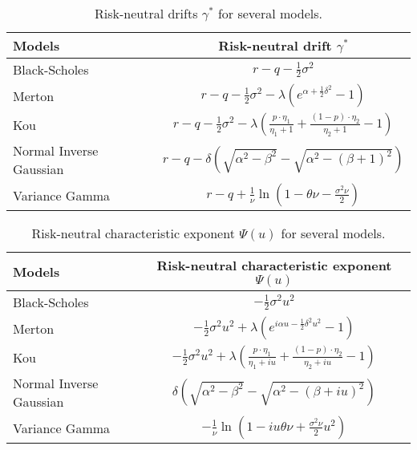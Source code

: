 \begin{table}[!ht]
\centering
  
  \begin{tabular}{l|c}
    \toprule
    Models & Risk-neutral drift $\gamma^\ast$ \\
    \toprule
   Black-Scholes & $r-q-\frac{1}{2}\sigma^2$ \\
   \midrule
   Merton & $r-q -\frac{1}{2}\sigma^2 - \lambda\left(e^{\alpha+\frac{1}{2}\delta^2}-1\right)$\\
   Kou & $r-q- \frac{1}{2}\sigma^2 -\lambda \left(\frac{p\cdot\eta_1}{\eta_1+1}+\frac{(1-p)\cdot\eta_2}{\eta_2+1}-1\right)$\\
   \midrule
   Normal Inverse Gaussian & $r-q -\delta \left(\sqrt{\alpha^2-\beta^2}-\sqrt{\alpha^2-(\beta+1)^2}\right) $\\
   Variance Gamma &$r-q + \frac{1}{\nu}\ln\left(1-\theta\nu-\frac{\sigma^2\nu}{2}\right)$ \\
    \bottomrule
  \end{tabular}
  \vspace{5pt}
  \caption{\label{tab:rn_drift} Risk-neutral drifts $\gamma^\ast$ for several models.}
\end{table}

\begin{table}[!ht]
\centering
  \begin{tabular}{l|c}
    \toprule
    Models & Risk-neutral characteristic exponent $\Psi(u)$ \\
    \toprule
   Black-Scholes & $-\frac{1}{2}\sigma^2u^2$ \\
   \midrule
   Merton & $-\frac{1}{2}\sigma^2 u^2 + \lambda\left(e^{i\alpha u -\frac{1}{2}\delta^2 u^2}-1\right)$\\
   Kou & $-\frac{1}{2}\sigma^2 u^2 +\lambda\left(\frac{p\cdot\eta_1}{\eta_1+iu}+\frac{(1-p)\cdot\eta_2}{\eta_2+iu}-1\right)$\\
   \midrule
   Normal Inverse Gaussian & $\delta \left(\sqrt{\alpha^2-\beta^2}-\sqrt{\alpha^2-(\beta+iu)^2}\right)$\\
   Variance Gamma &$-\frac{1}{\nu}\ln\left(1-iu\theta\nu+\frac{\sigma^2\nu}{2}u^2\right)$ \\
    \bottomrule
  \end{tabular}
  \vspace{5pt}
  \caption{\label{tab:rn_ce} Risk-neutral characteristic exponent $\Psi(u)$ for several models.}
\end{table}
